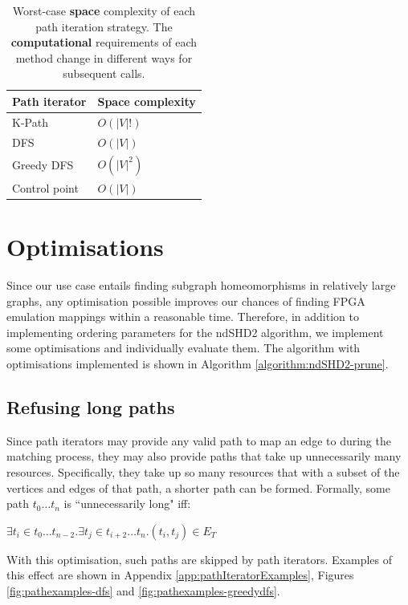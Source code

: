\begin{table}
\centering
\begin{tabular}{|l|l|}
\hline
\textbf{Path iterator} & \textbf{Space complexity} \\ \hline
K-Path                 & $O(|V|!)$                 \\ \hline
DFS                    & $O(|V|)$                  \\ \hline
Greedy DFS             & $O(|V|^2)$                \\ \hline
Control point          & $O(|V|)$                  \\ \hline
\end{tabular}
\caption{Worst-case \textbf{space} complexity of each path iteration strategy. The \textbf{computational} requirements of each method change in different ways for subsequent calls.}
\label{tab:iterator-spacerequirements}
\end{table}


\section{Optimisations}
\label{sec:optimisations}
Since our use case entails finding subgraph homeomorphisms in relatively large graphs, any optimisation possible improves our chances of finding FPGA emulation mappings within a reasonable time. Therefore, in addition to implementing ordering parameters for the ndSHD2 algorithm, we implement some optimisations and individually evaluate them. The algorithm with optimisations implemented is shown in Algorithm \ref{algorithm:ndSHD2-prune}.

\subsection{Refusing long paths}
\label{sec:refusinglongerpaths}
Since path iterators may provide any valid path to map an edge to during the matching process, they may also provide paths that take up unnecessarily many resources. Specifically, they take up so many resources that with a subset of the vertices and edges of that path, a shorter path can be formed. Formally, some path $t_0\dots t_n$ is ``unnecessarily long" iff:

$\exists t_i \in t_0\dots t_{n-2} . \exists t_j \in t_{i+2}\dots t_n . (t_i, t_j) \in E_T$

With this optimisation, such paths are skipped by path iterators. Examples of this effect are shown in Appendix \ref{app:pathIteratorExamples}, Figures \ref{fig:pathexamples-dfs}
 and \ref{fig:pathexamples-greedydfs}.

